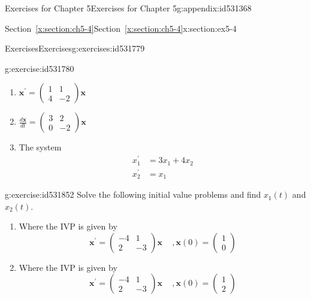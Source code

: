 \documentclass[oneside,10pt,]{book}
\newcommand{\xreffont}{\relax}
\numberwithin{equation}{section}
\numberwithin{equation}{section}
\newcommand{\amp}{&}
\begin{document}
\begin{appendixptx}{Exercises for Chapter 5}{}{Exercises for Chapter 5}{}{}{g:appendix:id531368}
\begin{sectionptx}{Section~{\xreffont\ref*{x:section:ch5-4}}}{}{Section~{\xreffont\ref*{x:section:ch5-4}}}{}{}{x:section:ex5-4}
\begin{exercises-subsection-numberless}{Exercises}{}{Exercises}{}{}{g:exercises:id531779}
\begin{divisionexercise}{1}{}{}{g:exercise:id531780}
\begin{enumerate}[label=(\alph*)]
\item{}\(\displaystyle {\displaystyle \mathbf{x}^{\prime}=\left(\begin{array}{cc}
1 \amp 1\\
4 \amp -2
\end{array}\right)\mathbf{x}}\)%
\item{}\(\displaystyle {\displaystyle \frac{d\mathbf{x}}{dt}=\left(\begin{array}{cc}
3 \amp 2\\
0 \amp -2
\end{array}\right)\mathbf{x}}\)%
\item{}The system%
\begin{align*}
x_{1}^{\prime} \amp =3x_{1}+4x_{2}\\
x_{2}^{\prime} \amp =x_{1} 
\end{align*}
%
\end{enumerate}
\end{divisionexercise}%
\begin{divisionexercise}{2}{}{}{g:exercise:id531852}%
Solve the following initial value problems and find \(x_{1}(t)\) and \(x_{2}(t)\).%
%
\begin{enumerate}[label=(\alph*)]
\item{}Where the IVP is given by%
\begin{equation*}
\mathbf{x}^{\prime}=\left(\begin{array}{cc}
-4 \amp 1\\
2 \amp -3
\end{array}\right)\mathbf{x}\,\,\,\,\,\,\,,\mathbf{x}(0)=\left(\begin{array}{c}
1\\
0
\end{array}\right)
\end{equation*}
%
\item{}Where the IVP is given by%
\begin{equation*}
\mathbf{x}^{\prime}=\left(\begin{array}{cc}
-4 \amp 1\\
2 \amp -3
\end{array}\right)\mathbf{x}\,\,\,\,\,\,\,,\mathbf{x}(0)=\left(\begin{array}{c}
1\\
2
\end{array}\right)
\end{equation*}
%
\end{enumerate}
\end{divisionexercise}%
\end{exercises-subsection-numberless}

\end{sectionptx}
\end{appendixptx}
\end{document}
